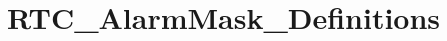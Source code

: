\hypertarget{group___r_t_c___alarm_mask___definitions}{\section{R\-T\-C\-\_\-\-Alarm\-Mask\-\_\-\-Definitions}
\label{group___r_t_c___alarm_mask___definitions}
}
